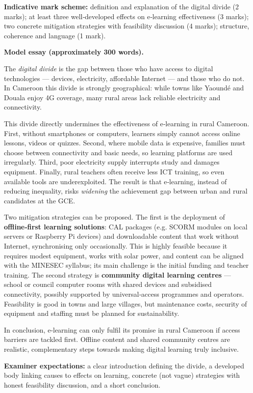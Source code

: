 \documentclass[11pt]{article}
\begin{document}
\begin{corrige}
\textbf{Indicative mark scheme:} definition and explanation of the digital divide (2 marks); at least three well‑developed effects on e‑learning effectiveness (3 marks); two concrete mitigation strategies with feasibility discussion (4 marks); structure, coherence and language (1 mark).

\textbf{Model essay (approximately 300 words).}

The \emph{digital divide} is the gap between those who have access to digital technologies — devices, electricity, affordable Internet — and those who do not. In Cameroon this divide is strongly geographical: while towns like Yaoundé and Douala enjoy 4G coverage, many rural areas lack reliable electricity and connectivity.

This divide directly undermines the effectiveness of e‑learning in rural Cameroon. First, without smartphones or computers, learners simply cannot access online lessons, videos or quizzes. Second, where mobile data is expensive, families must choose between connectivity and basic needs, so learning platforms are used irregularly. Third, poor electricity supply interrupts study and damages equipment. Finally, rural teachers often receive less ICT training, so even available tools are underexploited. The result is that e‑learning, instead of reducing inequality, risks \emph{widening} the achievement gap between urban and rural candidates at the GCE.

Two mitigation strategies can be proposed. The first is the deployment of \textbf{offline‑first learning solutions}: CAL packages (e.g. SCORM modules on local servers or Raspberry Pi devices) and downloadable content that work without Internet, synchronising only occasionally. This is highly feasible because it requires modest equipment, works with solar power, and content can be aligned with the MINESEC syllabus; its main challenge is the initial funding and teacher training. The second strategy is \textbf{community digital learning centres} — school or council computer rooms with shared devices and subsidised connectivity, possibly supported by universal‑access programmes and operators. Feasibility is good in towns and large villages, but maintenance costs, security of equipment and staffing must be planned for sustainability.

In conclusion, e‑learning can only fulfil its promise in rural Cameroon if access barriers are tackled first. Offline content and shared community centres are realistic, complementary steps towards making digital learning truly inclusive.

\textbf{Examiner expectations:} a clear introduction defining the divide, a developed body linking causes to effects on learning, concrete (not vague) strategies with honest feasibility discussion, and a short conclusion.
\end{corrige}
\end{document}
